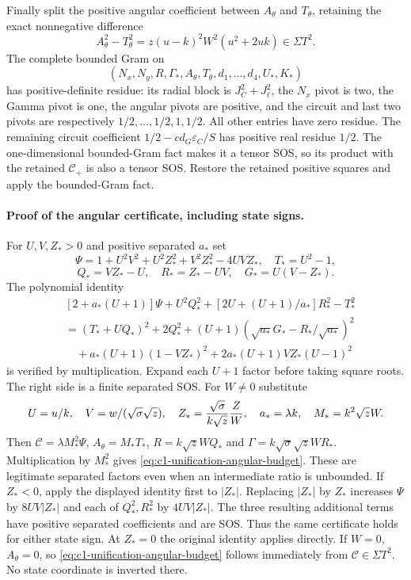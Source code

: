 Finally split the positive angular coefficient between $A_\theta$
and $T_\theta$, retaining the exact nonnegative difference
\[
 A_\theta^2-T_\theta^2=z(u-k)^2W^2(u^2+2uk)\in\Sigma T^2.
\]
The complete bounded Gram on
\[
 (N_x,N_y,R,\Gamma_*,A_\theta,T_\theta,d_1,\ldots,d_4,U_*,K_*)
\]
has positive-definite residue: its radial block is $J_C^2+J_\ell^2$,
the $N_x$ pivot is two, the Gamma pivot is one, the angular pivots
are positive, and the circuit and last two pivots are respectively
$1/2,\ldots,1/2,1,1/2$. All other entries have zero residue.
The remaining circuit coefficient
$1/2-cd_G\varepsilon_C/S$ has positive real residue $1/2$.
The one-dimensional bounded-Gram fact makes it a tensor SOS,
so its product with the retained $\mathscr C_+$ is also a tensor SOS.
Restore the retained positive squares and apply the bounded-Gram fact.

\paragraph{Proof of the angular certificate, including state signs.}
For $U,V,Z_*>0$ and positive separated $a_*$ set
\[
 \Psi=1+U^2V^2+U^2Z_*^2+V^2Z_*^2-4UVZ_*,\quad T_*=U^2-1,
\]
\[
 Q_*=VZ_*-U,\quad R_*=Z_*-UV,\quad G_*=U(V-Z_*).
\]
The polynomial identity
\begin{align*}
 &[2+a_*(U+1)]\Psi+U^2Q_*^2
       +[2U+(U+1)/a_*]R_*^2-T_*^2\\
 &=(T_*+UQ_*)^2+2Q_*^2
 +(U+1)(\sqrt{a_*}G_*-R_*/\sqrt{a_*})^2\\
 &\quad+a_*(U+1)(1-VZ_*)^2
       +2a_*(U+1)VZ_*(U-1)^2
\end{align*}
is verified by multiplication. Expand each $U+1$ factor before
taking square roots. The right side is a finite separated SOS.
For $W\ne0$ substitute
\[
 U=u/k,\quad V=w/(\sqrt\sigma\sqrt z),\quad
 Z_*={\sqrt\sigma\over k\sqrt z}{Z\over W},\quad
 a_*=\lambda k,\quad M_*=k^2\sqrt zW.
\]
Then $\mathscr C=\lambda M_*^2\Psi$,
$A_\theta=M_*T_*$, $R=k\sqrt zWQ_*$ and
$\Gamma=k\sqrt\sigma\sqrt zWR_*$. Multiplication by $M_*^2$
gives \eqref{eq:c1-unification-angular-budget}. These are legitimate
separated factors even when an intermediate ratio is unbounded.
If $Z_*<0$, apply the displayed identity first to $|Z_*|$.
Replacing $|Z_*|$ by $Z_*$ increases $\Psi$ by $8UV|Z_*|$ and
each of $Q_*^2,R_*^2$ by $4UV|Z_*|$. The three resulting additional
terms have positive separated coefficients and are SOS. Thus the
same certificate holds for either state sign. At $Z_*=0$ the original
identity applies directly. If $W=0$, $A_\theta=0$, so
\eqref{eq:c1-unification-angular-budget} follows immediately from
$\mathscr C\in\Sigma T^2$. No state coordinate is inverted there.

